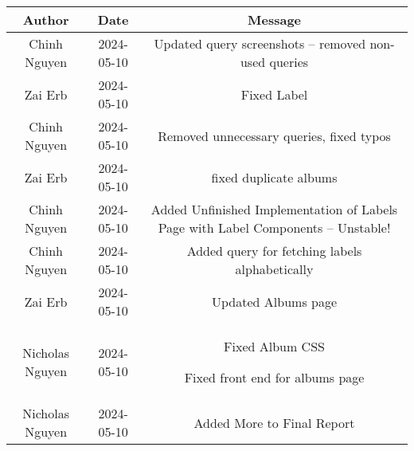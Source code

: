 \begin{tabular}{|c|c|c|}
\hline
Author & Date & Message \\
\hline
Chinh Nguyen & 2024-05-10 & Updated query screenshots -- removed non-used queries \\
Zai Erb & 2024-05-10 & Fixed Label \\
Chinh Nguyen & 2024-05-10 & Removed unnecessary queries, fixed typos \\
Zai Erb & 2024-05-10 & fixed duplicate albums \\
Chinh Nguyen & 2024-05-10 & Added Unfinished Implementation of Labels Page with Label Components -- Unstable! \\
Chinh Nguyen & 2024-05-10 & Added query for fetching labels alphabetically \\
Zai Erb & 2024-05-10 & Updated Albums page \\
Nicholas Nguyen & 2024-05-10 & Fixed Album CSS

Fixed front end for albums page \\
Nicholas Nguyen & 2024-05-10 & Added More to Final Report


\end{tabular}
